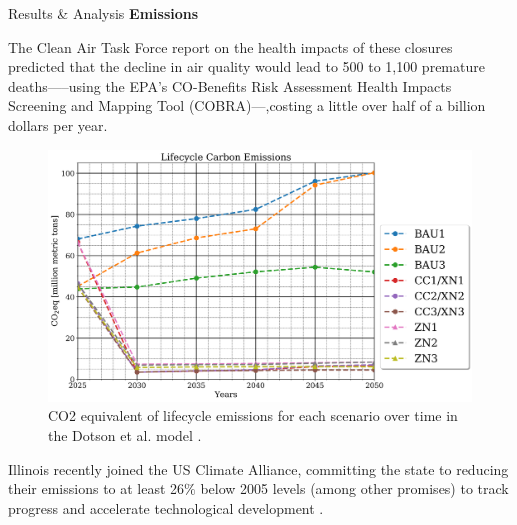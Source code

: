 \documentclass[final]{beamer}
\newlength{\onecolwid}
\newlength{\threecolwid}
\begin{document}
\begin{frame}[t]
\begin{columns}[t,totalwidth=\threecolwid]
\begin{column}{\onecolwid}
\begin{block}{Results \& Analysis}
\vspace{0.7em}
\textbf{Emissions}

The Clean Air Task Force report \cite{health} on the health impacts of these closures predicted that the decline in air quality would lead to 500 to 1,100 premature deaths—--using the EPA’s CO-Benefits Risk Assessment Health Impacts Screening and Mapping Tool (COBRA)---,costing a little over half of a billion dollars per year. 
\begin{figure}[ht]
  \centering
  \includegraphics[scale=0.7]{co2eq_all_comparison.png}
  \caption{CO2 equivalent of lifecycle emissions for each scenario over time in the Dotson et al. model \cite{dotson}.}
  \label{fig:co2eq_time}
\end{figure}

Illinois recently joined the US Climate Alliance, committing the state to reducing their emissions to at least 26$\%$ below 2005 levels (among other promises) to track progress and accelerate technological development \cite{climate}.






\end{block}
\end{column}
\end{columns}
\end{frame}
\end{document}
